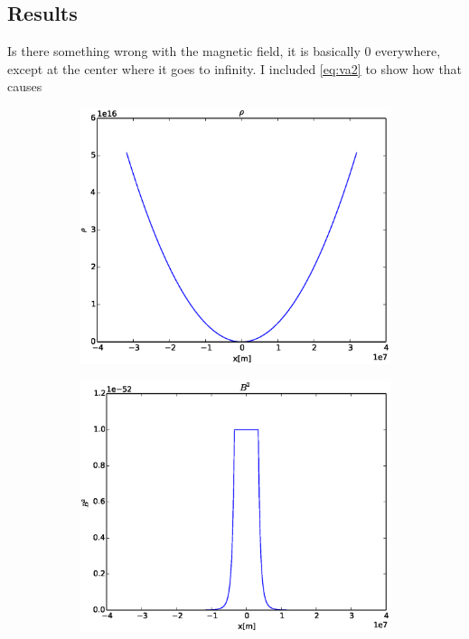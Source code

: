 \documentclass[x11names]{article}
\begin{document}
\subsection{Results}
  Is there something wrong with the magnetic field, it is basically \(0\) everywhere, except at the center where it goes to infinity. I included \cref{eq:va2} to show how that causes 
  \begin{figure}
    \centering
    \begin{subfigure}{0.45\linewidth}
      \includegraphics[width = \textwidth]{figures/rho}
    \end{subfigure}
    \begin{subfigure}{0.45\linewidth}
      \includegraphics[width = \textwidth]{figures/b2}

\end{subfigure}
\end{figure}
\end{document}
